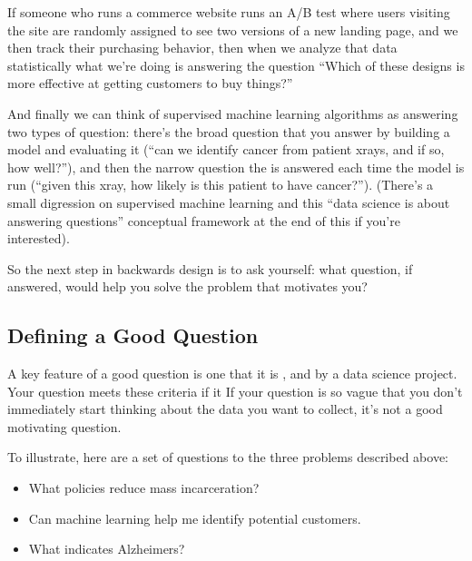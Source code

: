 \documentclass[letterpaper,10pt,english]{jupyterBook}
\begin{document}
\sphinxAtStartPar
If someone who runs a commerce website runs an A/B test where users visiting the site are randomly assigned to see two versions of a new landing page, and we then track their purchasing behavior, then when we analyze that data statistically what we’re doing is answering the question “Which of these designs is more effective at getting customers to buy things?”

\sphinxAtStartPar
And finally we can think of supervised machine learning algorithms as answering two types of question: there’s the broad question that you answer by building a model and evaluating it (“can we identify cancer from patient x\sphinxhyphen{}rays, and if so, how well?”), and then the narrow question the is answered each time the model is run (“given this x\sphinxhyphen{}ray, how likely is this patient to have cancer?”). (There’s a small digression on supervised machine learning and this “data science is about answering questions” conceptual framework at the end of this if you’re interested).

\sphinxAtStartPar
So the next step in backwards design is to ask yourself: what question, if answered, would help you solve the problem that motivates you?


\subsection{Defining a Good Question}
\label{\detokenize{40_in_practice/05_backwards_design:defining-a-good-question}}
\sphinxAtStartPar
A key feature of a good question is one that it is ,  and  by a data science project. Your question meets these criteria if it  If your question is so vague that you don’t immediately start thinking about the data you want to collect, it’s not a good motivating question.

\sphinxAtStartPar
To illustrate, here are a set of  questions to the three problems described above:
\begin{itemize}
\item {} 
\sphinxAtStartPar
What policies reduce mass incarceration?

\item {} 
\sphinxAtStartPar
Can machine learning help me identify potential customers.

\item {} 
\sphinxAtStartPar
What indicates Alzheimers?

\end{itemize}
\end{document}
